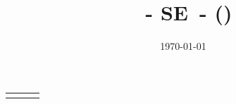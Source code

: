 \documentclass[twoside, a4paper, 10pt]{article}
\begin{document}


\def\mytitle{%
    \myanime\ - S\myserie E\myepisode\ - \myepisodename
    \ifx\mytimes\empty
    \else
        \space(\mytimes)
    \fi
}
\title{\Large{\mytitle}}
\author{\myauthor}
\date{\today}

\maketitle
\thispagestyle{empty}


\newpage

\setcounter{page}{1}

\begin{tabularx}{\textwidth}{rcX}
    && \\
    
    
    
\end{tabularx}
    
\end{document}
